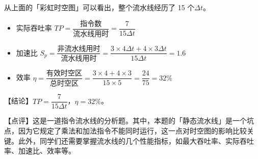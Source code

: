 \documentclass[UTF8]{ctexart}
\begin{document}
从上面的「彩虹时空图」可以看出，整个流水线经历了 15 个$\Delta t$。

\begin{itemize}
    \item 实际吞吐率 $TP = \dfrac{\text{指令数}}{\text{流水线用时}} = \dfrac{7}{15\Delta t}$
    \item 加速比 $S_p = \dfrac{\text{非流水线用时}}{\text{流水线用时}} = \dfrac{3\times 4\Delta t+4\times 3\Delta t}{15\Delta t} = 1.6$
    \item 效率 $\eta = \dfrac{\text{有效时空区}}{\text{总时空区}} = \dfrac{3\times 4+4\times 3}{15\times 5} = \dfrac{24}{75} = 32\%$
\end{itemize}

\vspace{1em}

{\color{cyan!80!black}
【结论】$TP=\dfrac{7}{15\Delta t}$，$\eta = 32\%$。

\vspace{0.5em}
【点评】这是一道指令流水线的分析题。其中，本题的「静态流水线」是一个坑点，因为它规定了乘法和加法指令不能同时运行，这一点对时空图的影响比较关键。此外，同学们还需要掌握流水线的几个性能指标，如最大吞吐率、实际吞吐率、加速比、效率等。
}
\end{document}
